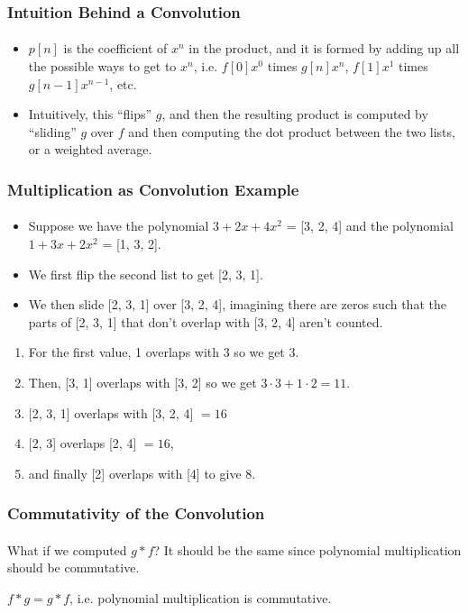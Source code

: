 \documentclass{beamer}                             %
\begin{document}
\begin{frame}
\frametitle{Intuition Behind a Convolution}
\framesubtitle{}
\begin{itemize}
  \item \( p[n] \) is the coefficient of \( x^n \) in the product,
    and it is formed by adding up all the possible ways to get to \(
    x^n \), i.e. \( f[0] x^0 \) times \( g[n] x^n \), \( f[1] x^1 \)
    times \( g[n - 1] x^{n - 1} \), etc.
  \item Intuitively, this \enquote{flips} \( g \), and then the resulting
    product is computed by \enquote{sliding} \( g \) over \( f \) and then
    computing the dot product between the two lists, or a weighted average.
\end{itemize}
\end{frame}

\begin{frame}
\frametitle{Multiplication as Convolution Example}
\framesubtitle{}
\begin{itemize}[<+->]
  \item Suppose we have the polynomial \( 3 + 2x + 4x^2 \) =
    [3, 2, 4] and the polynomial \( 1 + 3x + 2x^2 \) = [1, 3, 2].
  \item We first flip
    the second list to get [2, 3, 1].
  \item We then slide [2, 3, 1] over [3, 2, 4], imagining
    there are zeros such that the parts of [2, 3, 1] that
    don't overlap with [3, 2, 4] aren't counted.
\end{itemize}

\begin{enumerate}[<+->]
  \item For the first value, 1 overlaps with 3 so we get 3.
  \item Then, [3, 1] overlaps with [3, 2] so
    we get \( 3 \cdot 3 + 1 \cdot 2 = 11 \).
  \item \( [ \)2, 3, 1] overlaps with [3, 2, 4] \( = 16 \)
  \item \( [ \)2, 3] overlaps [2, 4] \( = 16 \),
  \item and finally [2] overlaps with [4] to give 8.
\end{enumerate}

\end{frame}

\begin{frame}
\frametitle{Commutativity of the Convolution}
\framesubtitle{}
What if we computed \( g * f \)? It should be the same since
polynomial multiplication should be commutative.
\begin{theorem}
    \( f * g = g * f \), i.e. polynomial multiplication is commutative.
\end{theorem}
\end{frame}
\end{document}
